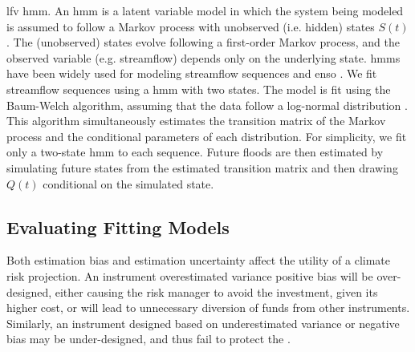 \documentclass[
  draft,
  linenumbers
]{agujournal2019}
\begin{document}
 \gls{lfv}  \gls{hmm}.
An \gls{hmm} is a latent variable model in which the system being modeled is assumed to follow a Markov process with unobserved (i.e.\@\xspace hidden) states $S(t)$ \citep{Rabiner:1986jk}.
The (unobserved) states evolve following a first-order Markov process, and the observed variable (e.g.\@\xspace streamflow) depends only on the underlying state.
\Glspl{hmm} have been widely used for modeling streamflow sequences \citep{Bracken:2016ba} and \gls{enso} \citep{rojohernandez:2017}.
We fit  streamflow sequences using a \gls{hmm} with two states.
The model is fit using the Baum-Welch algorithm, assuming that the data follow a log-normal distribution .
This algorithm simultaneously estimates the transition matrix of the Markov process and the conditional parameters of each distribution.
For simplicity, we fit only a two-state \gls{hmm} to each sequence.
Future floods are then estimated by simulating future states from the estimated transition matrix and then drawing $Q(t)$ conditional on the simulated state.

\subsection{Evaluating Fitting Models}\label{sec:methods-evaluating}

Both estimation bias and estimation uncertainty affect the utility of a climate risk projection.
An instrument   overestimated variance  positive bias will be over-designed, either causing the risk manager to avoid the investment, given its higher cost, or will lead to unnecessary diversion of funds from other instruments.
Similarly, an instrument designed based on underestimated variance or negative bias may be under-designed, and thus fail to protect the .
\end{document}
